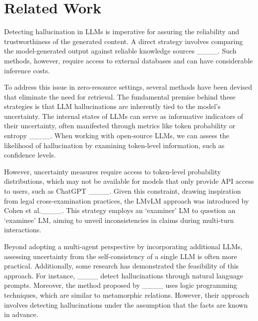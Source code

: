 \section{Related Work}
Detecting hallucination in LLMs is imperative for assuring the reliability and trustworthiness of the generated content. A direct strategy involves comparing the model-generated output against reliable knowledge sources ____. Such methods, however, require access to external databases and can have considerable inference costs.

To address this issue in zero-resource settings, several methods have been devised that eliminate the need for retrieval. The fundamental premise behind these strategies is that LLM hallucinations are inherently tied to the model's uncertainty. The internal states of LLMs can serve as informative indicators of their uncertainty, often manifested through metrics like token probability or entropy ____. When working with open-source LLMs, we can assess the likelihood of hallucination by examining token-level information, such as confidence levels.

However, uncertainty measures require access to token-level probability distributions, which may not be available for models that only provide API access to users, such as ChatGPT ____. Given this constraint, drawing inspiration from legal cross-examination practices, the LMvLM approach was introduced by Cohen et al.____. This strategy employs an `examiner' LM to question an `examinee' LM, aiming to unveil inconsistencies in claims during multi-turn interactions.

Beyond adopting a multi-agent perspective by incorporating additional LLMs, assessing uncertainty from the self-consistency of a single LLM is often more practical. Additionally, some research has demonstrated the feasibility of this approach. For instance, ____ detect hallucinations through natural language prompts. Moreover, the method proposed by ____ uses logic programming techniques, which are similar to metamorphic relations. However, their approach involves detecting hallucinations under the assumption that the facts are known in advance.



